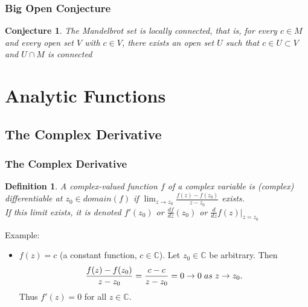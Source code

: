 \documentclass{article}
\newtheorem{definition}{Definition}[section]
\newtheorem{conjecture}{Conjecture}[section]
\begin{document}
\subsubsection{Big Open Conjecture}
\begin{conjecture}
The Mandelbrot set is locally connected, that is, for every $c \in M$ and every open set $V$ with $c \in V$, there exists an open set $U$ such that $c \in U \subset V$ and $U \cap M$ is connected
\end{conjecture}

\section{Analytic Functions}

\subsection{The Complex Derivative}

\subsubsection{The Complex Derivative}
\begin{definition}
A complex-valued function $f$ of a complex variable is (complex) differentiable at $z_0 \in domain(f)$ if $\lim_{z \to z_0} \frac{f(z) - f(z_0)}{z - z_0}$ exists. \\
If this limit exists, it is denoted $f'(z_0)$ or $\frac{df}{dz}(z_0)$ or $\frac{d}{dz}f(z)\rvert_{z=z_0}$
\end{definition}
Example:
\begin{itemize}
\item $f(z) = c$ (a constant function, $c \in \mathbb{C}$). Let $z_0 \in \mathbb{C}$ be arbitrary. Then
\begin{equation*}
\frac{f(z) - f(z_0)}{z - z_0} = \frac{c - c}{z - z_0} = 0 \to 0 \hspace{0.1cm} as \hspace{0.1cm} z \to z_0.
\end{equation*}
Thus $f'(z) = 0$ for all $z \in \mathbb{C}$.
\end{itemize}
\end{document}
